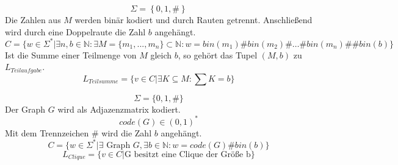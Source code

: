 \begin{aufgabe}[(a)]
\teilaufgabe
$$\Sigma = \left\{ 0,1,\# \right\}$$
Die Zahlen aus $M$ werden bin\"ar kodiert und durch Rauten getrennt. Anschlie\ss end wird durch eine Doppelraute die Zahl $b$ angeh\"angt. 
$$C = \{w \in \Sigma^* | \exists n,b \in \mathbb{N}: \exists M = \{m_1,...,m_n\} \subset\mathbb{N}: w = bin(m_1)\#bin(m_2)\#\ldots\#bin(m_n)\#\#bin(b) \}$$
Ist die Summe einer Teilmenge von $M$ gleich $b$, so geh\"ort das Tupel $(M,b)$ zu $L_{Teilaufgabe}$.
$$L_{Teilsumme} = \{ v \in C | \exists K \subseteq M: \sum K = b\}$$
\teilaufgabe

$$\Sigma = \{0,1,\#\}$$
Der Graph $G$ wird als Adjazenzmatrix kodiert.
$$code(G) \in (0,1)^*$$
Mit dem Trennzeichen $\#$  wird die Zahl $b$ angeh\"angt. 
$$C = \{ w \in \Sigma^* |\exists \text{ Graph }G, \exists b \in \mathbb{N}: w=code(G)\#bin(b) \}$$
$$L_{Clique} = \{ v \in C | \text{G besitzt eine Clique der Gr\"o\ss e b} \}$$

\end{aufgabe}